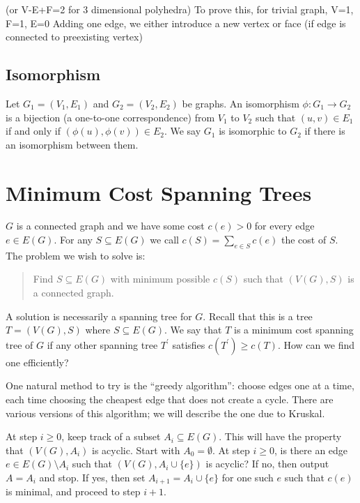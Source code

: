 (or V-E+F=2 for 3 dimensional polyhedra)
To prove this, 
for trivial graph, V=1, F=1, E=0
Adding one edge, we either introduce a new vertex or face (if edge is connected to preexisting vertex)

\subsection{Isomorphism}
\begin{definition}[Isomorphism]
Let $G_1 = (V_1, E_1)$ and $G_2 = (V_2, E_2)$ be graphs. An isomorphism $\phi : G_1 \to G_2$ is a bijection (a one-to-one correspondence) from $V_1$ to $V_2$ such that $(u,v) \in E_1$ if and only if $(\phi(u),\phi(v)) \in E_2$. We say $G_1$ is isomorphic to $G_2$ if there is an isomorphism between them.
\end{definition}

\section{Minimum Cost Spanning Trees}
$G$ is a connected graph and we have some cost $c(e)>0$ for every edge $e\in E(G)$. For any $S\subseteq E(G)$ we call $c(S)=\sum_{e\in S}c(e)$ the cost of $S$. The problem we wish to solve is:

\begin{quote}
Find $S\subseteq E(G)$ with minimum possible $c(S)$ such that $(V(G),S)$ is a connected graph.
\end{quote}

A solution is necessarily a spanning tree for $G$. Recall that this is a tree $T=(V(G),S)$ where $S\subseteq E(G)$. We say that $T$ is a minimum cost spanning tree of $G$ if any other spanning tree $T^\prime$ satisfies $c(T^\prime)\ge c(T)$. How can we find one efficiently?

One natural method to try is the ``greedy algorithm'': choose edges one at a time, each time choosing the cheapest edge that does not create a cycle. There are various versions of this algorithm; we will describe the one due to Kruskal.

\begin{theorem}
At step $i\ge0$, keep track of a subset $A_i\subseteq E(G)$. This will have the property that $(V(G),A_i)$ is acyclic. Start with $A_0=\emptyset$. At step $i\ge0$, is there an edge $e\in E(G)\setminus A_i$ such that $(V(G),A_i\cup\{e\})$ is acyclic? If no, then output $A=A_i$ and stop. If yes, then set $A_{i+1}=A_i\cup\{e\}$ for one such $e$ such that $c(e)$ is minimal, and proceed to step $i+1$.
\end{theorem}

